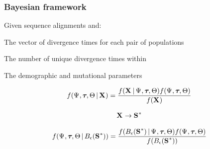 \begin{frame}
    \frametitle{Bayesian framework}
    Given sequence alignments \alignmentVector and: \\
        \begin{mydescription}
            \item[\divtvector] The vector of divergence times for each pair of populations
            \item[\numt{}] The number of unique divergence times within \divtvector
            \item[\model{}] The demographic and mutational parameters
        \end{mydescription}
    \begin{displaybox}[7.5cm]
    \[
        f(\numt{}, \divtvector, \model{} \given \alignmentVector) = 
        \frac{f(\alignmentVector \given \numt{}, \divtvector, \model{})
        f(\numt{}, \divtvector, \model{})}
        {f(\alignmentVector)}
    \]\vspace{0mm}
    \end{displaybox}
    \smallskip
    \[ \alignmentVector \to \ssVectorObs \]
    \begin{displaybox}[9.5cm]
    \[
        f(\numt{}, \divtvector, \model{} \given \euclideanSpace{\ssVectorObs}) = 
        \frac{f(\euclideanSpace{\ssVectorObs} \given \numt{}, \divtvector, \model{})
        f(\numt{}, \divtvector, \model{})}
        {f(\euclideanSpace{\ssVectorObs})}
    \]\vspace{0mm}
    \end{displaybox}

\end{frame}

